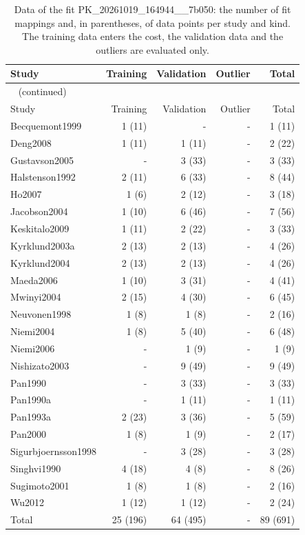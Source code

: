 \documentclass{article}
\begin{document}
\begin{longtable}{lrrrr}
\caption{Data of the fit PK\_20261019\_164944\_\_7b050: the number of fit mappings and, in parentheses, of data points per study and kind. The training data enters the cost, the validation data and the outliers are evaluated only.}\label{tab:data:PK_20261019_164944__7b050} \\
\toprule
Study & Training & Validation & Outlier & Total \\
\midrule
\endfirsthead
\multicolumn{5}{l}{\small\tablename~\thetable{} (continued)} \\
\toprule
Study & Training & Validation & Outlier & Total \\
\midrule
\endhead
\bottomrule
\endlastfoot
Becquemont1999 & 1 (11) & - & - & 1 (11) \\
Deng2008 & 1 (11) & 1 (11) & - & 2 (22) \\
Gustavson2005 & - & 3 (33) & - & 3 (33) \\
Halstenson1992 & 2 (11) & 6 (33) & - & 8 (44) \\
Ho2007 & 1 (6) & 2 (12) & - & 3 (18) \\
Jacobson2004 & 1 (10) & 6 (46) & - & 7 (56) \\
Keskitalo2009 & 1 (11) & 2 (22) & - & 3 (33) \\
Kyrklund2003a & 2 (13) & 2 (13) & - & 4 (26) \\
Kyrklund2004 & 2 (13) & 2 (13) & - & 4 (26) \\
Maeda2006 & 1 (10) & 3 (31) & - & 4 (41) \\
Mwinyi2004 & 2 (15) & 4 (30) & - & 6 (45) \\
Neuvonen1998 & 1 (8) & 1 (8) & - & 2 (16) \\
Niemi2004 & 1 (8) & 5 (40) & - & 6 (48) \\
Niemi2006 & - & 1 (9) & - & 1 (9) \\
Nishizato2003 & - & 9 (49) & - & 9 (49) \\
Pan1990 & - & 3 (33) & - & 3 (33) \\
Pan1990a & - & 1 (11) & - & 1 (11) \\
Pan1993a & 2 (23) & 3 (36) & - & 5 (59) \\
Pan2000 & 1 (8) & 1 (9) & - & 2 (17) \\
Sigurbjoernsson1998 & - & 3 (28) & - & 3 (28) \\
Singhvi1990 & 4 (18) & 4 (8) & - & 8 (26) \\
Sugimoto2001 & 1 (8) & 1 (8) & - & 2 (16) \\
Wu2012 & 1 (12) & 1 (12) & - & 2 (24) \\
Total & 25 (196) & 64 (495) & - & 89 (691) \\
\end{longtable}
\end{document}
